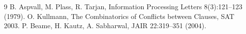 \documentclass[10pt]{article}
\begin{document}
\begin{thebibliography}{9}
 B. Aspvall, M. Plass, R. Tarjan, Information Processing Letters 8(3):121--123 (1979).
 O. Kullmann, The Combinatorics of Conflicts between Clauses, SAT 2003.
 P. Beame, H. Kautz, A. Sabharwal, JAIR 22:319--351 (2004).
\end{thebibliography}
\end{document}
